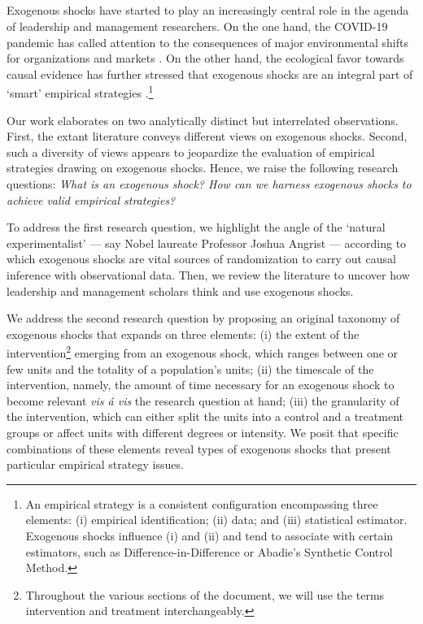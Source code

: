 \documentclass[11pt]{article}
\begin{document}
\begin{refsection}

\section{}
\label{sec:introduction}

\noindent Exogenous shocks have started to play an increasingly central role in the agenda of leadership and management researchers. On the one hand, the COVID-19 pandemic has called attention to the consequences of major environmental shifts for organizations \autocite{kniffin_et_al_2021} and markets \autocite{zhang_et_al_2020}.  On the other hand, the ecological favor towards causal evidence has further stressed that exogenous shocks are an integral part of `smart' empirical strategies \autocite{angrist_2022}.\footnote{An empirical strategy is a consistent configuration encompassing three elements: (i) empirical identification; (ii) data; and (iii) statistical estimator. Exogenous shocks influence (i) and (ii) and tend to associate with certain estimators, such as Difference-in-Difference or Abadie's Synthetic Control Method.}

Our work elaborates on two analytically distinct but interrelated observations. First, the extant literature conveys different views on exogenous shocks. Second, such a diversity of views appears to jeopardize the evaluation of empirical strategies drawing on exogenous shocks.  Hence, we raise the following research questions: \textit{What is an exogenous shock? How can we harness exogenous shocks to achieve valid empirical strategies?}

To address the first research question, we highlight the angle of the `natural experimentalist' --- say Nobel laureate Professor Joshua Angrist ---  according to which exogenous shocks are vital sources of randomization to carry out causal inference with observational data.  Then, we review the literature to uncover how leadership and management scholars think and use exogenous shocks.

We address the second research question by proposing an original taxonomy of exogenous shocks that expands on three elements: (i) the extent of the intervention\footnote{Throughout the various sections of the document, we will use the terms intervention and treatment interchangeably.} emerging from an exogenous shock, which ranges between one or few units and the totality of a population's units; (ii) the timescale of the intervention, namely,  the amount of time necessary for an exogenous shock to become relevant  \textit{vis \'a vis} the research question at hand; (iii) the granularity of the intervention, which can either split the units into a control and a  treatment groups or affect units with different degrees or intensity.  We posit that specific combinations of these elements reveal types of exogenous shocks that present particular empirical strategy issues.


\end{refsection}
\end{document}
